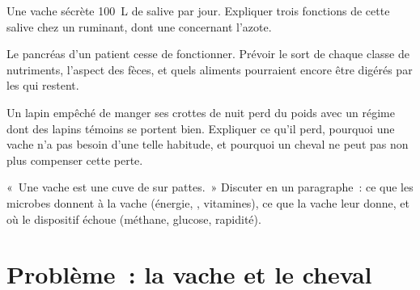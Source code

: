 \begin{exercise}[$\star\star$]\label{exo:b1:digestion-absorption:9}
Une vache sécrète \qty{100}{L} de salive par jour. Expliquer trois
fonctions de cette salive chez un ruminant, dont une concernant
l'azote.
\end{exercise}

\begin{exercise}[$\star\star\star$]\label{exo:b1:digestion-absorption:10}
Le pancréas d'un patient cesse de fonctionner. Prévoir le sort de
chaque classe de nutriments, l'aspect des fèces, et quels aliments
pourraient encore être digérés par les  qui restent.
\end{exercise}

\begin{exercise}[$\star\star\star$]\label{exo:b1:digestion-absorption:11}
Un lapin empêché de manger ses crottes de nuit perd du poids avec un
régime dont des lapins témoins se portent bien. Expliquer ce qu'il
perd, pourquoi une vache n'a pas besoin d'une telle habitude, et
pourquoi un cheval ne peut pas non plus compenser cette perte.
\end{exercise}

\begin{exercise}[$\star\star\star$]\label{exo:b1:digestion-absorption:12}
«~Une vache est une cuve de  sur pattes.~» Discuter en un
paragraphe~: ce que les microbes donnent à la vache (énergie, ,
vitamines), ce que la vache leur donne, et où le dispositif échoue
(méthane, glucose, rapidité).
\end{exercise}

\section{Problème~: la vache et le cheval}

